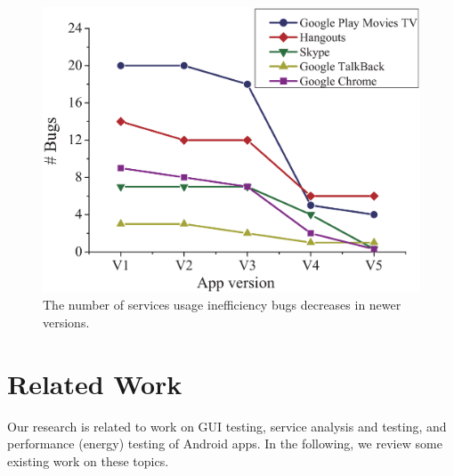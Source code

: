 \documentclass[sigconf,review, anonymous]{acmart}
\begin{document}
 \begin{figure}
 \centering
  \includegraphics[scale=0.35]{bugs-vs-versions.eps}
 \caption{The number of services usage inefficiency bugs decreases in newer versions.}
\label{fig_bugsvsversions}
\end{figure}


\section{Related Work}\label{relatedwork}
Our research is related to work on GUI testing, service analysis and testing,
and performance (energy) testing of Android apps. In the following, we review
some existing work on these topics.
\end{document}
